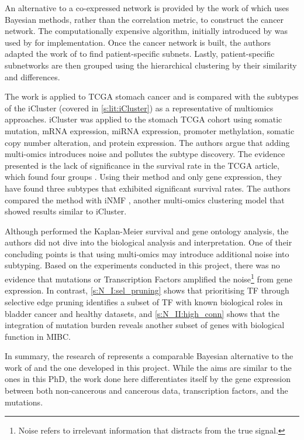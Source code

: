 An alternative to a co-expressed network is provided by the work of \citet{Nakazawa2021-yq} which uses Bayesian methods, rather than the correlation metric, to construct the cancer network. The computationally expensive algorithm, initially introduced by \citet{Imoto2001-uc} was used by \citet{Tamada2011-ok} for implementation. Once the cancer network is built, the authors adapted the work of \citet{Tanaka2020-mw} to find patient-specific subnets. Lastly, patient-specific subnetworks are then grouped using the hierarchical clustering by their similarity and differences.

The work is applied to TCGA stomach cancer and is compared with the subtypes of the iCluster \citep{Shen2009-ew} (covered in \cref{s:lit:iCluster}) as a representative of multiomics approaches. iCluster was applied to the stomach TCGA cohort using somatic mutation, mRNA expression, miRNA expression, promoter methylation, somatic copy number alteration, and protein expression. The authors \citet{Nakazawa2021-yq} argue that adding multi-omics introduces noise and pollutes the subtype discovery. The evidence presented is the lack of significance in the survival rate in the TCGA article, which found four groups \citep{Cancer_Genome_Atlas_Research_Network2014-xp}. Using their method and only gene expression, they have found three subtypes that exhibited significant survival rates. The authors compared the method with iNMF \citep{Yang2016-dm}, another multi-omics clustering model that showed results similar to iCluster.

Although \cite{Nakazawa2021-yq} performed the Kaplan-Meier survival and gene ontology analysis, the authors did not dive into the biological analysis and interpretation. One of their concluding points is that using multi-omics may introduce additional noise into subtyping. Based on the experiments conducted in this project, there was no evidence that mutations or Transcription Factors amplified the noise\footnote{Noise refers to irrelevant information that distracts from the true signal.} from gene expression. In contrast, \cref{s:N_I:sel_pruning} shows that prioritising TF through selective edge pruning identifies a subset of TF with known biological roles in bladder cancer and healthy datasets, and \cref{s:N_II:high_conn} shows that the integration of mutation burden reveals another subset of genes with biological function in MIBC.


In summary, the research of \citet{Nakazawa2021-yq} represents a comparable Bayesian alternative to the work of \citet{Care2019-ij} and the one developed in this project. While the aims are similar to the ones in this PhD, the work done here differentiates itself by the gene expression between both non-cancerous and cancerous data, transcription factors, and the mutations.


